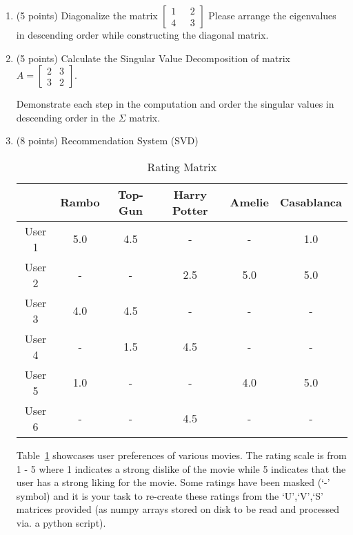 \documentclass{article}%
\begin{document}
\begin{enumerate}
    \setcounter{enumi}{0}
    \item (5 points) Diagonalize the matrix 
    $\begin{bmatrix}
        1 \ \ \ & 2\\
        4 \ \ \ & 3
    \end{bmatrix}$
    Please arrange the eigenvalues in descending order while constructing the diagonal matrix.
    
    \item (5 points) Calculate the Singular Value Decomposition of matrix
    $A = \begin{bmatrix}
        2 & 3\\
        3 & 2
    \end{bmatrix}$.
    
    Demonstrate each step in the computation and order the singular values in descending order in the $\Sigma$ matrix.
    
    \item (8 points) Recommendation System (SVD)
    
    \begin{table}[!ht]
        \centering
        \begin{tabular}{|c|c|c|c|c|c|}
             \toprule
              & Rambo & Top-Gun & Harry Potter& Amelie & Casablanca \\\hline
             User 1&5.0&4.5&-&-&1.0\\\hline
             User 2&-&-&2.5&5.0&5.0\\\hline
             User 3&4.0&4.5&-&-&-\\\hline
             User 4&-&1.5&4.5&-&-\\\hline
             User 5&1.0&-&-&4.0&5.0\\\hline
             User 6&-&-&4.5&-&-\\ \hline
        \end{tabular}
        \caption{Rating Matrix}
        \label{tab:rating matrix}
    \end{table}
    
    Table~\ref{tab:rating matrix} showcases user preferences of various movies. The rating scale is from 1 - 5 where 1 indicates a strong dislike of the movie while 5 indicates that the user has a strong liking for the movie. Some ratings have been masked (`-' symbol) and it is your task to re-create these ratings from the `U',`V',`S' matrices provided (as numpy arrays stored on disk to be read and processed via. a python script).
    

\end{enumerate}
\end{document}
